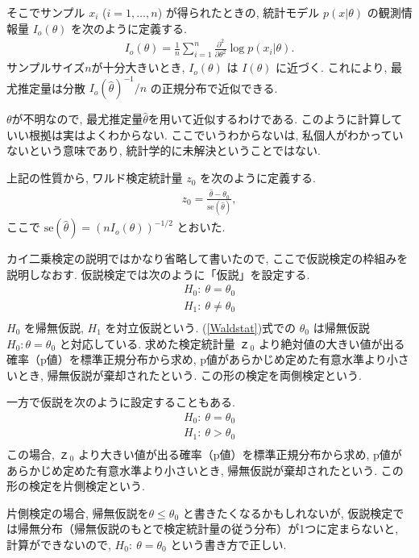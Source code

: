 \documentclass[a4paper, 12pt]{jarticle}
\begin{document}
そこでサンプル $x_i$ ($i=1,\ldots,n$) が得られたときの, 統計モデル $p(x|\theta)$ の観測情報量 $I_o(\theta)$ を次のように定義する.
\begin{align}
I_o(\theta)=\frac{1}{n}\sum_{i=1}^{n} \frac{\partial^2}{\partial \theta^2}\log p(x_i|\theta).
\end{align}
サンプルサイズ$n$が十分大きいとき, $I_o(\theta)$ は $I(\theta)$ に近づく. 
これにより, 最尤推定量は分散 $I_o(\hat \theta)^{-1}/n$ の正規分布で近似できる. 

$\theta$が不明なので, 最尤推定量$\hat \theta$を用いて近似するわけである. このように計算していい根拠は実はよくわからない. ここでいうわからないは, 私個人がわかっていないという意味であり, 統計学的に未解決ということではない. 
 
上記の性質から, ワルド検定統計量 $z_0$ を次のように定義する. 
\begin{align}
z_0=\frac{\hat \theta-\theta_0}{\mathrm{se}(\hat \theta)},
\label{Waldstat}
\end{align}
ここで $\mathrm{se}(\hat \theta) = (nI_o(\theta))^{-1/2}$ とおいた. 

カイ二乗検定の説明ではかなり省略して書いたので, ここで仮説検定の枠組みを説明しなおす.
仮説検定では次のように「仮説」を設定する. 
\begin{align}
H_0:~\theta = \theta_0\\
H_1:~\theta \neq \theta_0\\
 \end{align}
 $H_0$ を帰無仮説, $H_1$ を対立仮説という.
(\ref{Waldstat})式での $\theta_0$ は帰無仮説 $H_0: \theta = \theta_0$ と対応している.
求めた検定統計量 $ｚ_0$ より絶対値の大きい値が出る確率（p値）を標準正規分布から求め, p値があらかじめ定めた有意水準より小さいとき, 帰無仮説が棄却されたという.
この形の検定を両側検定という. 

一方で仮説を次のように設定することもある. 
\begin{align}
H_0:~\theta = \theta_0\\
H_1:~\theta > \theta_0\\
 \end{align}
 この場合, $ｚ_0$ より大きい値が出る確率（p値）を標準正規分布から求め, p値があらかじめ定めた有意水準より小さいとき, 帰無仮説が棄却されたという.
この形の検定を片側検定という. 

片側検定の場合, 帰無仮説を$\theta \le \theta_0$ と書きたくなるかもしれないが, 仮説検定では帰無分布（帰無仮説のもとで検定統計量の従う分布）が1つに定まらないと, 計算ができないので, $H_0:~\theta = \theta_0$ という書き方で正しい.
\end{document}
